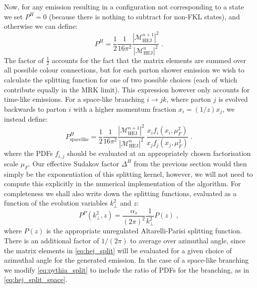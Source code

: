 Now, for any emission resulting in a configuration not corresponding to a \HEJ state we set
$P^H = 0$ (because there is nothing to subtract for non-FKL states),
and otherwise we can define:
\begin{equation}
P^H  = \frac{1}{2} \frac{1}{16 \pi^2} \frac{|\mathcal{M}^{n+1}_\mathrm{HEJ}|^2}{|\mathcal{M}^n_\mathrm{HEJ}|^2}\;.\label{eq:hej_split}
\end{equation}
The factor of $\frac{1}{2}$ accounts for the fact that the matrix elements are summed over all possible colour connections, but for each parton shower emission we wish to calculate the splitting function for
one of two possible choices (each of which contribute equally in the MRK limit). This expression however only accounts for time-like emissions. 
For a space-like branching $i\rightarrow jk$, where parton $j$ is evolved backwards to parton $i$ with a higher momentum fraction $x_i = (1/z) x_j$, we instead define:
\begin{equation}
\label{eq:hej_split_space}
P^H_\mathrm{spacelike} = \frac{1}{2}  \frac{1}{16 \pi^2}  \frac{|\mathcal{M}^{n+1}_\mathrm{HEJ}|^2}{|\mathcal{M}^n_\mathrm{HEJ}|^2} \, \frac{x_i f_i(x_i,\mu_F^2)}{x_j f_j(x_j,\mu_F^2)}\;.
\end{equation}
where the PDFs $f_{i,j}$ should be evaluated at an appropriately
chosen factorisation scale $\mu_F$.  Our effective Sudakov factor $\Delta^H$
from the previous section would then simply be the exponentiation of this
splitting kernel, however, we will not need to compute this explicitly in the numerical
implementation of the algorithm.
For completeness we shall also write down the \py
splitting functions, evaluated as a function of the evolution
variables $k^2_\perp$ and $z$:
\begin{equation}
 P^P(k^2_\perp,z) = \frac{\alpha_s}{(2\pi)^2} \frac{1}{k^2_\perp}P(z)\;,\label{eq:pythia_split}
\end{equation}
where $P(z)$ is the appropriate unregulated Altarelli-Parisi splitting
function. There is an additional factor of
$1/(2\pi)$ to average over azimuthal angle, since the matrix elements
in \cref{eq:hej_split} will be evaluated for a given choice of
azimuthal angle for the generated emission. In the case of a space-like
branching we modify \cref{eq:pythia_split} to include the ratio
of PDFs for the branching, as in \cref{eq:hej_split_space}. 


